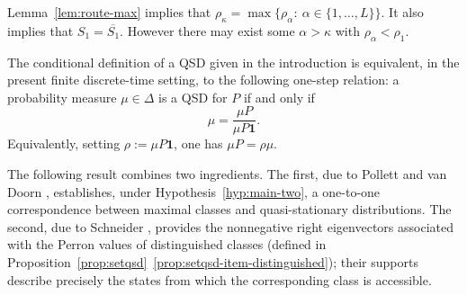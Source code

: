 \documentclass[10pt,letterpaper]{article}
\theoremstyle{compactplain}
\theoremstyle{compactdefinition}
\newcommand{\1}{\mathds{1}}
\begin{document}
Lemma~\ref{lem:route-max} implies that
\(\rho_\kappa=\max\{\rho_\alpha:\ \alpha\in\{1,\ldots,L\}\}\).
It also implies that \(S_1=\overline{S_1}\). 
However there may exist some $\alpha >\kappa$ with $\rho_\alpha <\rho_1$. 

The conditional definition of a QSD given in the introduction is equivalent, in
the present finite discrete-time setting, to the following one-step relation: a
probability measure \(\mu\in\Delta\) is a QSD for \(P\) if and only if
\[
\mu=\frac{\mu P}{\mu P\mathbf 1}.
\]
Equivalently, setting \(\rho:=\mu P\mathbf 1\), one has \(\mu P=\rho\mu.\)
\medskip



The following result combines two ingredients. The first, due to Pollett and
van Doorn \cite[Theorems~4.1--4.2]{pollett2008quasi}, establishes,  under
Hypothesis~\ref{hyp:main-two}, a one-to-one correspondence between maximal
classes and quasi-stationary distributions. The second, due to Schneider
\cite{schneider1986influence}, provides the nonnegative right eigenvectors
associated with the Perron values of distinguished classes (defined in
Proposition~\ref{prop:setqsd}~\eqref{prop:setqsd-item-distinguished}); their
supports describe precisely the states from which the corresponding class is
accessible.
\end{document}
